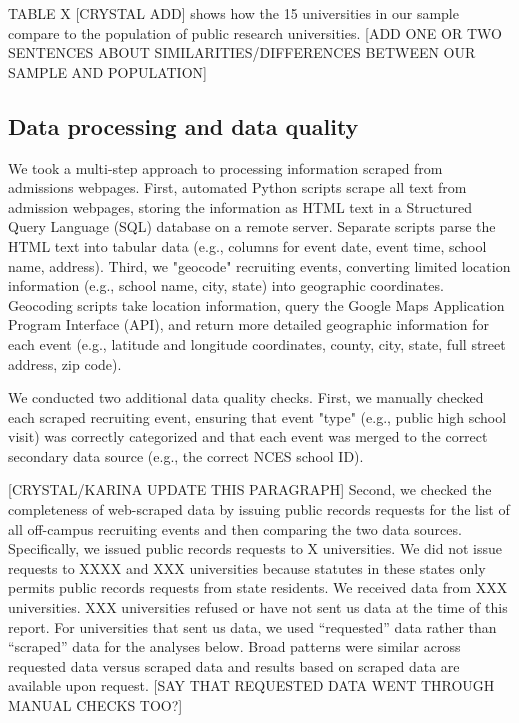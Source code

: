 \documentclass[twoside]{article}
\begin{document}
TABLE X [CRYSTAL ADD] shows how the 15 universities in our sample compare to the population of public research universities. [ADD ONE OR TWO SENTENCES ABOUT SIMILARITIES/DIFFERENCES BETWEEN OUR SAMPLE AND POPULATION]

\subsection*{Data processing and data quality}

We took a multi-step approach to processing information scraped from admissions webpages. First, automated Python scripts scrape all text from admission webpages, storing the information as HTML text in a Structured Query Language (SQL) database on a remote server. Separate scripts parse the HTML text into tabular data (e.g., columns for event date, event time, school name, address). Third, we "geocode" recruiting events, converting limited location information (e.g., school name, city, state) into geographic coordinates. Geocoding scripts take location information, query the Google Maps Application Program Interface (API), and return more detailed geographic information for each event (e.g., latitude and longitude coordinates, county, city, state, full street address, zip code).

We conducted two additional data quality checks. First, we manually checked each scraped recruiting event, ensuring that event "type" (e.g., public high school visit) was correctly categorized and that each event was merged to the correct secondary data source (e.g., the correct NCES school ID). 

[CRYSTAL/KARINA UPDATE THIS PARAGRAPH] Second, we checked the completeness of web-scraped data by issuing public records requests for the list of all off-campus recruiting events and then comparing the two data sources. Specifically, we issued public records requests to X universities. We did not issue requests to XXXX and XXX universities because statutes in these states only permits public records requests from state residents. We received data from XXX universities. XXX universities refused or have not sent us data at the time of this report. For universities that sent us data, we used ``requested'' data rather than ``scraped'' data for the analyses below. Broad patterns were similar across requested data versus scraped data and results based on scraped data are available upon request. [SAY THAT REQUESTED DATA WENT THROUGH MANUAL CHECKS TOO?]

\end{document}
